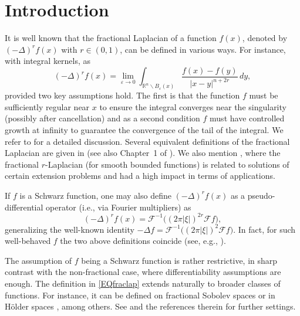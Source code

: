 \documentclass[reqno,11pt]{amsart}
\theoremstyle{definition}
\begin{document}
\tableofcontents



	
\section{Introduction}

It is well known that the fractional Laplacian of a function $f(x)$, denoted by $(-\Delta)^r f(x)$ with $r \in (0,1)$, can be defined in various ways. For instance, with integral kernels, as
\begin{equation}
	\label{EQfraclap}
(-\Delta)^r f(x) = \lim_{\varepsilon\to 0}\int_{\mathbb{R}^n\backslash B_\varepsilon(x)}\frac{f(x)-f(y)}{|x-y|^{n+2r}}\, dy,
\end{equation}
provided two key assumptions hold. The first is that the function $f$ must be sufficiently regular near $x$ to ensure the integral converges near the singularity (possibly after cancellation) and as a second condition $f$ must have controlled growth at infinity to guarantee the convergence of the tail of the integral. We refer to \cite{VALBOOK2,BV,DNPV} for a detailed discussion. Several equivalent definitions of the fractional Laplacian are given in \cite{kwa} (see also Chapter~1 of \cite{VALBOOK2}). We also mention \cite{CS, CSS}, where the fractional $r$-Laplacian (for smooth bounded functions) is related to solutions of certain extension problems and had a high impact in terms of applications.


If $f$ is a Schwarz function, one may also define $(-\Delta)^r f(x)$ as a pseudo-differential operator (i.e., via Fourier multipliers) as
\begin{equation}
	\label{EQlaplacianfourier}
(-\Delta)^r f(x) = \mathcal{F}^{-1}\big( (2\pi |\xi|)^{2r} \mathcal{F}f\big),
\end{equation}
generalizing the well-known identity $-\Delta f = \mathcal{F}^{-1}\big( (2\pi |\xi|)^2 \mathcal{F}f\big)$. In fact, for such well-behaved $f$ the two above definitions coincide (see, e.g., \cite{DNPV}).



The assumption of $f$ being a Schwarz function is rather restrictive, in sharp contrast with the non-fractional case, where differentiability assumptions are enough. The definition in \eqref{EQfraclap} extends naturally to broader classes of functions. For instance, it can be defined on fractional Sobolev spaces \cite{DNPV} or in H\"older spaces  \cite{SILDUE}, among others. See \cite{kwa} and the references therein for further settings.
\end{document}
